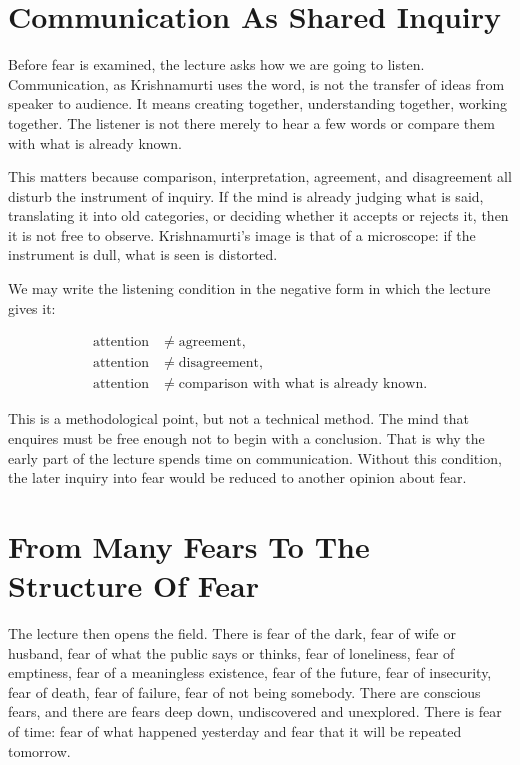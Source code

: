 \section{Communication As Shared Inquiry}

Before fear is examined, the lecture asks how we are going to listen. Communication, as Krishnamurti uses the word, is not the transfer of ideas from speaker to audience. It means creating together, understanding together, working together. The listener is not there merely to hear a few words or compare them with what is already known.

This matters because comparison, interpretation, agreement, and disagreement all disturb the instrument of inquiry. If the mind is already judging what is said, translating it into old categories, or deciding whether it accepts or rejects it, then it is not free to observe. Krishnamurti's image is that of a microscope: if the instrument is dull, what is seen is distorted.

We may write the listening condition in the negative form in which the lecture gives it:

\begin{align}
\text{attention} &\neq \text{agreement},\\
\text{attention} &\neq \text{disagreement},\\
\text{attention} &\neq \text{comparison with what is already known}.
\end{align}

This is a methodological point, but not a technical method. The mind that enquires must be free enough not to begin with a conclusion. That is why the early part of the lecture spends time on communication. Without this condition, the later inquiry into fear would be reduced to another opinion about fear.

\section{From Many Fears To The Structure Of Fear}

The lecture then opens the field. There is fear of the dark, fear of wife or husband, fear of what the public says or thinks, fear of loneliness, fear of emptiness, fear of a meaningless existence, fear of the future, fear of insecurity, fear of death, fear of failure, fear of not being somebody. There are conscious fears, and there are fears deep down, undiscovered and unexplored. There is fear of time: fear of what happened yesterday and fear that it will be repeated tomorrow.

